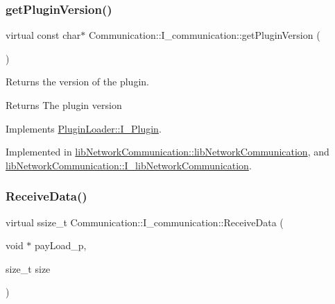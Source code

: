 \mbox{\label{classCommunication_1_1I__communication_a3ff1f75536d5a7394ef736353bd29e53}} 
\subsubsection{\texorpdfstring{getPluginVersion()}{getPluginVersion()}}
{\footnotesize\ttfamily virtual const char$\ast$ Communication\+::\+I\+\_\+communication\+::get\+Plugin\+Version (\begin{DoxyParamCaption}{ }\end{DoxyParamCaption})\hspace{0.3cm}{\ttfamily [pure virtual]}}



Returns the version of the plugin. 

\begin{DoxyReturn}{Returns}
The plugin version 
\end{DoxyReturn}


Implements \mbox{\hyperlink{classPluginLoader_1_1I__Plugin_a43fb739a14ea1cc5ca6a77896a5f7b8f}{Plugin\+Loader\+::\+I\+\_\+\+Plugin}}.



Implemented in \mbox{\hyperlink{classlibNetworkCommunication_1_1libNetworkCommunication_a78dce6f61316f1f2068c0f03c7cc4b32}{lib\+Network\+Communication\+::lib\+Network\+Communication}}, and \mbox{\hyperlink{classlibNetworkCommunication_1_1I__libNetworkCommunication_a07a5da99fc896208065f34aa89453499}{lib\+Network\+Communication\+::\+I\+\_\+lib\+Network\+Communication}}.

\mbox{\label{classCommunication_1_1I__communication_a48699762983e2bc64cc1e0642bf2e235}} 
\subsubsection{\texorpdfstring{ReceiveData()}{ReceiveData()}}
{\footnotesize\ttfamily virtual ssize\+\_\+t Communication\+::\+I\+\_\+communication\+::\+Receive\+Data (\begin{DoxyParamCaption}\item[{void $\ast$}]{pay\+Load\+\_\+p,  }\item[{size\+\_\+t}]{size }\end{DoxyParamCaption})\hspace{0.3cm}{\ttfamily [pure virtual]}}



